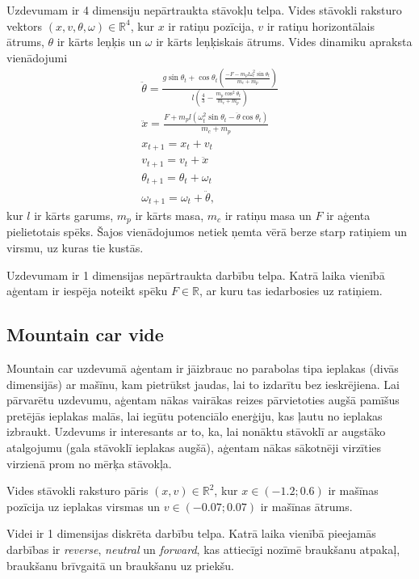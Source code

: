 \documentclass{ludis} %
\begin{document}
Uzdevumam ir 4 dimensiju nepārtraukta stāvokļu telpa. Vides stāvokli raksturo
vektors $(x, v, \theta, \omega) \in \mathbb{R}^4$, kur $x$ ir ratiņu pozīcija,
$v$ ir ratiņu horizontālais ātrums, $\theta$ ir kārts leņķis un $\omega$ ir
kārts leņķiskais ātrums. Vides dinamiku apraksta vienādojumi
\begin{gather}
  \ddot{\theta} = \frac{g \sin\theta_t + \cos\theta_t \left(\frac{-F - m_p l \omega_t^2\sin\theta_t}
                                                         {m_c + m_p}\right)}
                        {l \left(\frac{4}{3} - \frac{m_p\cos^2\theta_t}
                                               {m_c + m_p}\right)} \\ 
  \ddot{x} = \frac{F + m_p l \left(\omega_t^2\sin\theta_t - \ddot{\theta}\cos\theta_t\right)}
                   {m_c + m_p} \\
  x_{t+1} = x_t + v_t \\
  v_{t+1} = v_t + \ddot{x} \\
  \theta_{t+1} = \theta_t + \omega_t \\
  \omega_{t+1} = \omega_t + \ddot{\theta},
\end{gather}
kur $l$ ir kārts garums, $m_p$ ir kārts masa, $m_c$ ir ratiņu masa un $F$ ir
aģenta pielietotais spēks. Šajos vienādojumos
netiek ņemta vērā berze starp ratiņiem un virsmu, uz kuras tie kustās.

Uzdevumam ir 1 dimensijas nepārtraukta darbību telpa. Katrā laika vienībā
aģentam ir iespēja noteikt spēku $F \in \mathbb{R}$, ar kuru tas iedarbosies uz
ratiņiem.

\subsection{Mountain car vide}
Mountain car uzdevumā aģentam ir jāizbrauc no parabolas tipa ieplakas (divās
dimensijās) ar mašīnu, kam pietrūkst jaudas, lai to izdarītu bez ieskrējiena.
Lai pārvarētu uzdevumu, aģentam nākas vairākas reizes pārvietoties augšā
pamīšus pretējās ieplakas malās, lai iegūtu potenciālo enerģiju, kas ļautu no
ieplakas izbraukt. Uzdevums ir interesants ar to, ka, lai nonāktu stāvoklī ar
augstāko atalgojumu (gala stāvoklī ieplakas augšā), aģentam nākas sākotnēji
virzīties virzienā prom no mērķa stāvokļa.

Vides stāvokli raksturo pāris $(x, v) \in \mathbb{R}^2$, kur $x \in (-1.2; 0.6)$
ir mašīnas pozīcija uz ieplakas virsmas un $v \in (-0.07; 0.07)$ ir mašīnas
ātrums.

Videi ir 1 dimensijas diskrēta darbību telpa. Katrā laika vienībā pieejamās
darbības ir \textit{reverse}, \textit{neutral} un \textit{forward}, kas
attiecīgi nozīmē braukšanu atpakaļ, braukšanu brīvgaitā un braukšanu uz
priekšu.
\end{document}
